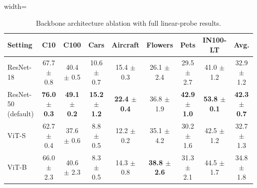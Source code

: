 \begin{table}[H]
\centering
\scriptsize
\setlength{\tabcolsep}{3.5pt}
\caption{Backbone architecture ablation with full linear-probe results.}
\label{tab:app_architecture_linear}
\begin{adjustbox}{width=\textwidth}
\begin{tabular}{l c c c c c c c c}
\toprule
Setting & C10 & C100 & Cars & Aircraft & Flowers & Pets & IN100-LT & Avg. \\
\midrule
ResNet-18 & 67.7 {\scriptsize$\pm$ 0.8} & 40.4 {\scriptsize$\pm$ 0.5} & 10.6 {\scriptsize$\pm$ 0.7} & 15.4 {\scriptsize$\pm$ 0.3} & 26.1 {\scriptsize$\pm$ 2.4} & 29.5 {\scriptsize$\pm$ 2.7} & 41.0 {\scriptsize$\pm$ 1.2} & 32.9 {\scriptsize$\pm$ 1.2} \\
ResNet-50 (default) & \textbf{76.0 {\scriptsize$\pm$ 0.3}} & \textbf{49.1 {\scriptsize$\pm$ 0.2}} & \textbf{15.2 {\scriptsize$\pm$ 1.2}} & \textbf{22.4 {\scriptsize$\pm$ 0.4}} & 36.8 {\scriptsize$\pm$ 1.9} & \textbf{42.9 {\scriptsize$\pm$ 1.0}} & \textbf{53.8 {\scriptsize$\pm$ 0.1}} & \textbf{42.3 {\scriptsize$\pm$ 0.7}} \\
ViT-S & 62.7 {\scriptsize$\pm$ 0.4} & 37.6 {\scriptsize$\pm$ 0.6} & 8.8 {\scriptsize$\pm$ 0.5} & 12.2 {\scriptsize$\pm$ 0.2} & 35.1 {\scriptsize$\pm$ 4.2} & 30.2 {\scriptsize$\pm$ 1.6} & 42.5 {\scriptsize$\pm$ 1.2} & 32.7 {\scriptsize$\pm$ 1.3} \\
ViT-B & 66.0 {\scriptsize$\pm$ 2.3} & 40.6 {\scriptsize$\pm$ 2.3} & 8.3 {\scriptsize$\pm$ 0.5} & 14.3 {\scriptsize$\pm$ 0.8} & \textbf{38.8 {\scriptsize$\pm$ 2.6}} & 31.3 {\scriptsize$\pm$ 2.1} & 44.5 {\scriptsize$\pm$ 1.7} & 34.8 {\scriptsize$\pm$ 1.8} \\
\bottomrule
\end{tabular}
\end{adjustbox}
\end{table}
